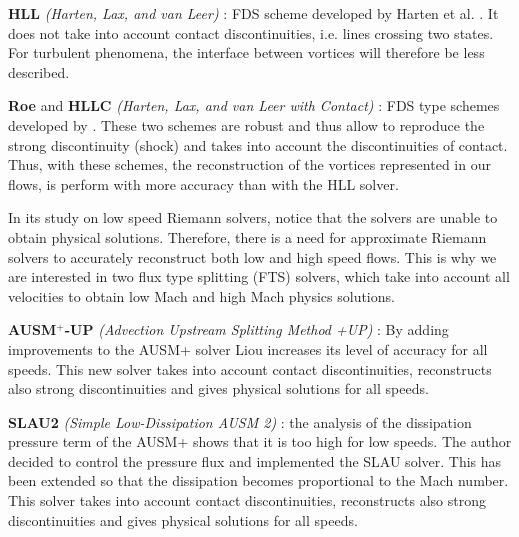 \noindent
\textbf{HLL} \textit{(Harten, Lax, and van Leer)} : FDS
scheme developed by
Harten et al. \cite{harten1983upstream}.
It does not take into account
contact discontinuities, i.e. lines crossing two states.
For turbulent phenomena,
the interface between vortices will
therefore be less described.

\noindent
\textbf{Roe}  and \textbf{HLLC} \textit{(Harten, Lax, and van Leer with Contact)} : FDS type schemes developed by \cite{toro1994restoration}\cite{Roe1981approximate}. These two schemes are robust and thus allow to reproduce the strong discontinuity (shock) and takes into account the discontinuities of contact. Thus, with these schemes, the reconstruction of the vortices represented in our flows, is perform with more accuracy than with the HLL solver.

\noindent
In its study on low speed Riemann solvers, \cite{qu2014study} notice that the solvers are unable to obtain physical solutions. Therefore, there is a need for approximate Riemann solvers to accurately reconstruct both low and high speed flows. This is why we are interested in two flux type splitting (FTS) solvers, which take into account all velocities to obtain low Mach and high Mach physics solutions.

\noindent
\textbf{AUSM$^+$-UP} \textit{(Advection Upstream Splitting Method +UP)} : By adding improvements \cite{liou2006sequel} to the AUSM+ \cite{liou1996sequel} solver Liou increases its level of accuracy for all speeds. This new solver takes into account contact discontinuities, reconstructs also strong discontinuities and gives physical solutions for all speeds.

\noindent
\textbf{SLAU2} \textit{(Simple Low-Dissipation AUSM 2)} :
the analysis of the dissipation pressure term of the AUSM+ \cite{shima2009new} shows that it is too high for low speeds.  The author decided to control the pressure flux and implemented the SLAU solver.
This
has been extended
\cite{kitamura2013towards}
so that the dissipation becomes proportional to the Mach number. This solver takes into account contact discontinuities, reconstructs also strong discontinuities and gives physical solutions for all speeds.






